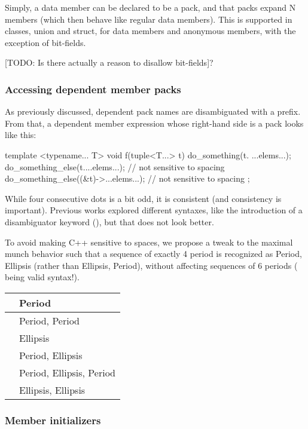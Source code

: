 \documentclass{wg21}
\begin{document}
Simply, a data member can be declared to be a pack, and that packs expand N members (which then behave like regular data members).
This is supported in classes, union and struct, for data members and anonymous members, with the exception of bit-fields.

[TODO: Is there actually a reason to disallow bit-fields]?

\subsubsection{Accessing dependent member packs}

As previously discussed, dependent pack names are disambiguated with a  prefix.
From that, a dependent member expression whose right-hand side is a pack looks like this:

\begin{colorblock}
template <typename... T>
void f(tuple<T...> t) {
   do_something(t. ...elems...);
   do_something_else(t....elems...); // not sensitive to spacing
   do_something_else((&t)->...elems...); // not sensitive to spacing
};
\end{colorblock}

While four consecutive dots is a bit odd, it is consistent (and consistency is important).
Previous works explored different syntaxes, like the introduction of a disambiguator keyword (),
but that does not look better.

To avoid making C++ sensitive to spaces, we propose a tweak to the maximal munch behavior such that a sequence of exactly 4 period
is recognized as Period, Ellipsis (rather than Ellipsis, Period), without affecting sequences of 6 periods ( being valid syntax!).

\begin{tabular}{|c|l|}
\hline
\tcode{.}& Period \\
\hline
\tcode{..}& Period, Period \\
\hline
\tcode{...}& Ellipsis \\
\hline
\tcode{....}& Period, Ellipsis \\
\hline
\tcode{.....}& Period, Ellipsis, Period\\
\hline
\tcode{......}& Ellipsis, Ellipsis \\
\hline
\end{tabular}


\subsubsection{Member initializers}
\end{document}
